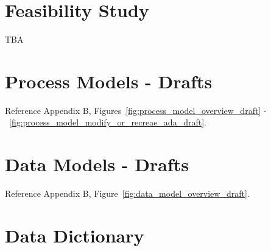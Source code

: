 \documentclass[twoside]{article}
\begin{document}
\begin{multicols}{2} %


\section{Feasibility Study}

TBA


\section{Process Models - Drafts}

Reference Appendix B, Figures~\ref{fig:process_model_overview_draft} -~\ref{fig:process_model_modify_or_recreae_ada_draft}.


\section{Data Models - Drafts}

Reference Appendix B, Figure~\ref{fig:data_model_overview_draft}.


\section{Data Dictionary}


\end{multicols}
\end{document}
